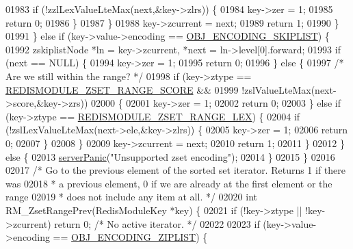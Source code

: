 \begin{DoxyCode}
{{{01983                 \textcolor{keywordflow}{if} (!zzlLexValueLteMax(next,&key->zlrs)) \{
01984                     key->zer = 1;
01985                     \textcolor{keywordflow}{return} 0;
01986                 \}
01987             \}
01988             key->zcurrent = next;
01989             \textcolor{keywordflow}{return} 1;
01990         \}
01991     \} \textcolor{keywordflow}{else} \textcolor{keywordflow}{if} (key->value->encoding == \hyperlink{server_8h_acfb35db5cb30ed113ed23aeb1a224c4c}{OBJ\_ENCODING\_SKIPLIST}) \{
01992         zskiplistNode *ln = key->zcurrent, *next = ln->level[0].forward;
01993         \textcolor{keywordflow}{if} (next == NULL) \{
01994             key->zer = 1;
01995             \textcolor{keywordflow}{return} 0;
01996         \} \textcolor{keywordflow}{else} \{
01997             \textcolor{comment}{/* Are we still within the range? */}
01998             \textcolor{keywordflow}{if} (key->ztype == \hyperlink{module_8c_a103d0f18dc1536298a03324d5ba545be}{REDISMODULE\_ZSET\_RANGE\_SCORE} &&
01999                 !zslValueLteMax(next->score,&key->zrs))
02000             \{
02001                 key->zer = 1;
02002                 \textcolor{keywordflow}{return} 0;
02003             \} \textcolor{keywordflow}{else} \textcolor{keywordflow}{if} (key->ztype == \hyperlink{module_8c_a36d7bac3b2781ba9b076ee6feee141a1}{REDISMODULE\_ZSET\_RANGE\_LEX}) \{
02004                 \textcolor{keywordflow}{if} (!zslLexValueLteMax(next->ele,&key->zlrs)) \{
02005                     key->zer = 1;
02006                     \textcolor{keywordflow}{return} 0;
02007                 \}
02008             \}
02009             key->zcurrent = next;
02010             \textcolor{keywordflow}{return} 1;
02011         \}
02012     \} \textcolor{keywordflow}{else} \{
02013         \hyperlink{server_8h_a11cc378e7778a830b41240578de3b204}{serverPanic}(\textcolor{stringliteral}{"Unsupported zset encoding"});
02014     \}
02015 \}
02016 
02017 \textcolor{comment}{/* Go to the previous element of the sorted set iterator. Returns 1 if there was}
02018 \textcolor{comment}{ * a previous element, 0 if we are already at the first element or the range}
02019 \textcolor{comment}{ * does not include any item at all. */}
02020 \textcolor{keywordtype}{int} RM\_ZsetRangePrev(RedisModuleKey *key) \{
02021     \textcolor{keywordflow}{if} (!key->ztype || !key->zcurrent) \textcolor{keywordflow}{return} 0; \textcolor{comment}{/* No active iterator. */}
02022 
02023     \textcolor{keywordflow}{if} (key->value->encoding == \hyperlink{server_8h_aabf064ede983103f1fd0df2086e84eee}{OBJ\_ENCODING\_ZIPLIST}) \{
}}}
\end{DoxyCode}
